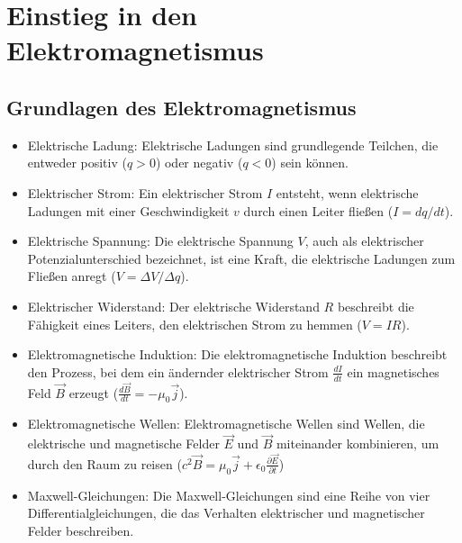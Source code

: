 \documentclass[a4paper]{report}
\begin{document}
\section{Einstieg in den Elektromagnetismus} 
\label{sec:Einstieg in den Elektromagnetismus}

\subsection{Grundlagen des Elektromagnetismus}

\begin{itemize} 
\item Elektrische Ladung: Elektrische Ladungen sind grundlegende Teilchen, die entweder positiv ($q>0$) oder negativ ($q<0$) sein können. 
\item Elektrischer Strom: Ein elektrischer Strom $I$ entsteht, wenn elektrische Ladungen mit einer Geschwindigkeit $v$ durch einen Leiter fließen ($I = dq/dt$). 
\item Elektrische Spannung: Die elektrische Spannung $V$, auch als elektrischer Potenzialunterschied bezeichnet, ist eine Kraft, die elektrische Ladungen zum Fließen anregt ($V = \Delta V/\Delta q$). 
\item Elektrischer Widerstand: Der elektrische Widerstand $R$ beschreibt die Fähigkeit eines Leiters, den elektrischen Strom zu hemmen ($V = IR$). 
\item Elektromagnetische Induktion: Die elektromagnetische Induktion beschreibt den Prozess, bei dem ein ändernder elektrischer Strom $\frac{dI}{dt}$ ein magnetisches Feld $\vec{B}$ erzeugt ($\frac{d\vec{B}}{dt} = -\mu_0\vec{j}$).
\item Elektromagnetische Wellen: Elektromagnetische Wellen sind Wellen, die elektrische und magnetische Felder $\vec{E}$ und $\vec{B}$ miteinander kombinieren, um durch den Raum zu reisen ($c^2\vec{B} = \mu_0\vec{j} + \epsilon_0\frac{\partial\vec{E}}{\partial t}$) \item Maxwell-Gleichungen: Die Maxwell-Gleichungen sind eine Reihe von vier Differentialgleichungen, die das Verhalten elektrischer und magnetischer Felder beschreiben. 
\end{itemize}
\end{document}
